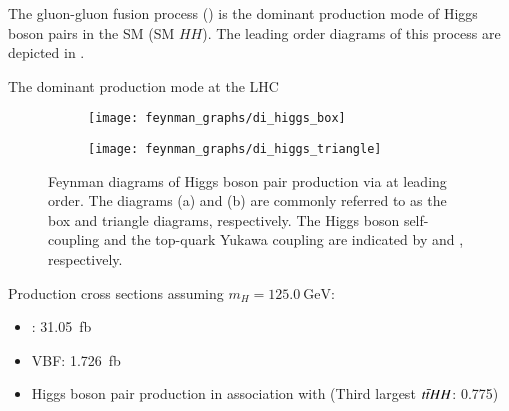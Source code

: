 The gluon-gluon fusion process (\ggF) is the dominant production mode of Higgs
boson pairs in the SM (SM $HH$). The leading order diagrams of this process are
depicted in .








The dominant production mode at the LHC

\begin{figure}[htbp]
  \centering

  \begin{subfigure}{0.49\textwidth}
    \centering
    \texttt{[image: feynman\_graphs/di\_higgs\_box]}
    \subcaption{}%
    \label{fig:dihiggs_ggf_feyn_box}
  \end{subfigure}\hfill%
  \begin{subfigure}{0.49\textwidth}
    \centering
    \texttt{[image: feynman\_graphs/di\_higgs\_triangle]}
    \subcaption{}%
    \label{fig:dihiggs_ggf_feyn_triangle}
  \end{subfigure}

  \caption{Feynman diagrams of Higgs boson pair production via \ggF at leading
    order. The diagrams (a) and (b) are commonly referred to as the box and
    triangle diagrams, respectively. The Higgs boson self-coupling and the
    top-quark Yukawa coupling are indicated by \ktop and \klambda,
    respectively.}%
  \label{fig:dihiggs_ggf_feyn}
\end{figure}

Production cross sections assuming $m_{H} = \SI{125.0}{\GeV}$:
\begin{itemize}
\item \ggF: \SI{31.05}{\femto\barn}~\cite{Grazzini:2018bsd}
\item VBF: \SI{1.726}{\femto\barn}~\cite{Dreyer:2018qbw,LHCHWGHH}
\item Higgs boson pair production in association with \ttbar (Third largest
  $t\bar{t} HH$: \SI{0.775}{})
\end{itemize}



